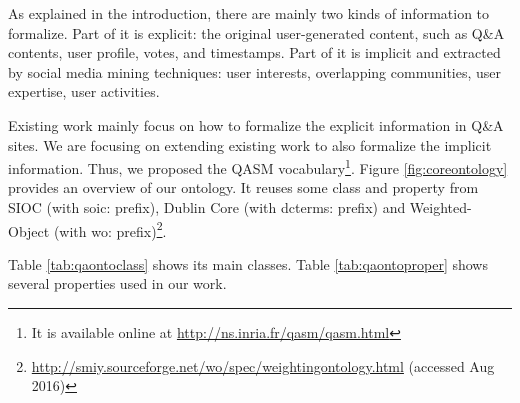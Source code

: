 As explained in the introduction, there are mainly two kinds of information to formalize. Part of it is explicit: the original user-generated content, such as Q\&A contents, user profile, votes, and timestamps. Part of it is implicit and extracted by social media mining techniques: user interests, overlapping communities, user expertise, user activities. 

Existing work mainly focus on how to formalize the explicit information in Q\&A sites. We are focusing on extending existing work to also formalize the implicit information. Thus, we proposed the QASM vocabulary\footnote{It is available online at \url{http://ns.inria.fr/qasm/qasm.html}}. Figure \ref{fig:coreontology} provides an overview of our ontology.
It reuses some class and property from SIOC (with soic: prefix), Dublin Core (with dcterms: prefix) and Weighted-Object (with wo: prefix)\footnote{\url{http://smiy.sourceforge.net/wo/spec/weightingontology.html} (accessed Aug 2016)}. 

Table \ref{tab:qaontoclass} shows its main classes.
Table \ref{tab:qaontoproper} shows several properties used in our work. 

